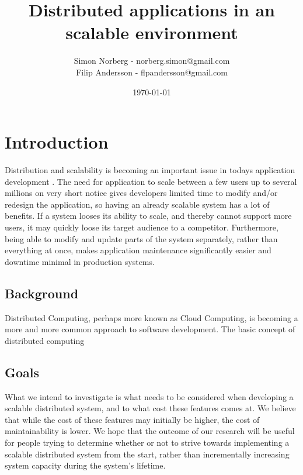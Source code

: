 \documentclass{article}
\begin{document}
 
\title{Distributed applications in an scalable environment}
\author{Simon Norberg - norberg.simon@gmail.com\\
        Filip Andersson - flpandersson@gmail.com }
\date{\today}
\maketitle
 
 
\section{Introduction}
Distribution and scalability is becoming an important issue in todays
application development \cite{rellermeyer2007services}.
The need for application to scale between a few users up to several millions 
on very short notice gives developers limited time to modify and/or redesign 
the application, so having an already scalable system has a lot of benefits. 
If a system looses its ability to scale, and thereby cannot support more users, 
it may quickly loose its target audience to a competitor. Furthermore, being able 
to modify and update parts of the system separately, rather than everything at 
once, makes application maintenance significantly easier and downtime minimal 
in production systems.

\subsection{Background}
Distributed Computing, perhaps more known as Cloud Computing, is becoming a
more and more common approach to software development. The basic concept of 
distributed computing 
 
\subsection{Goals} 
What we intend to investigate is what needs to be considered when developing a
scalable distributed system, and to what cost these features comes at. We
believe that while the cost of these features may initially be higher, the cost
of maintainability is lower. We hope that the outcome of our research will be
useful for people trying to determine whether or not to strive towards
implementing a scalable distributed system from the start, rather than
incrementally increasing system capacity during the system's lifetime.
\end{document}
